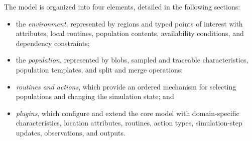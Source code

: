 

The model is organized into four elements, detailed in the following sections:

\begin{itemize} 
    \item the \textit{environment}, represented by regions and typed points of interest with attributes, local routines, population contents, availability conditions, and dependency constraints; 
    \item the \textit{population}, represented by blobs, sampled and traceable characteristics, population templates, and split and merge operations; 
    \item \textit{routines and actions}, which provide an ordered mechanism for selecting populations and changing the simulation state; and 
    \item \textit{plugins}, which configure and extend the core model with domain-specific characteristics, location attributes, routines, action types, simulation-step updates, observations, and outputs. 
\end{itemize}


